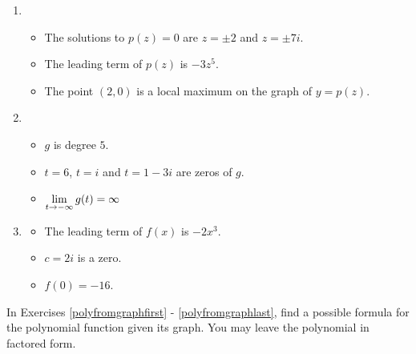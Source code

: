 \begin{enumerate}
\item

\begin{itemize}

\item The solutions to $p(z) = 0$ are $z = \pm 2$ and $z=\pm 7i$.
\item The leading term of $p(z)$ is $-3z^5$.
\item The point $(2,0)$ is a local maximum on the graph of $y=p(z)$.

\end{itemize}


\item

\begin{itemize}

\item $g$ is degree $5$.
\item $t=6$, $t = i$ and $t = 1-3i$ are zeros of $g$.
\item $\displaystyle{\lim_{t \rightarrow -\infty} g(t) = \infty}$ 

\end{itemize}

\item \label{buildcompolylast}

\begin{itemize}

\item The leading term of $f(x)$ is $-2x^3$.
\item $c=2i$ is a zero.
\item $f(0) = -16$.

\end{itemize}

\setcounter{HW}{\value{enumi}}
\end{enumerate}



In Exercises \ref{polyfromgraphfirst} - \ref{polyfromgraphlast}, find a possible formula for the polynomial function given its graph.  You may leave the polynomial in factored form. 

